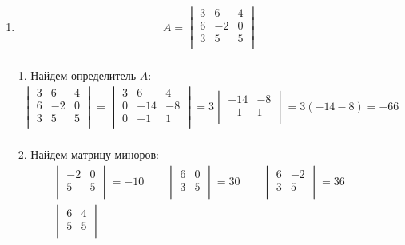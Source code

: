 \begin{enumerate}
		\item
			\begin{gather*}
				A = 
				\begin{vmatrix}
					3 & 6 & 4\\
					6 & -2 & 0\\
					3 & 5 & 5\\
				\end{vmatrix}
			\end{gather*} 
			\\
			1. Найдем определитель $A$:
			\begin{gather*}
				\begin{vmatrix}
					3 & 6 & 4\\
					6 & -2 & 0\\
					3 & 5 & 5\\
				\end{vmatrix}
				=
				\begin{vmatrix}
					3 & 6 & 4\\
					0 & -14 & -8\\
					0 & -1 & 1\\
				\end{vmatrix}
				= 3
				\begin{vmatrix}
					-14 & -8\\
					-1 & 1\\
				\end{vmatrix}
				= 3(-14 - 8) = -66
			\end{gather*} 
			\\
			2. Найдем матрицу миноров: 
			\begin{gather*}
				\begin{vmatrix}
					-2 & 0\\
					5 & 5\\
				\end{vmatrix}
				= -10\qquad
				\begin{vmatrix}
					6 & 0\\
					3 & 5\\
				\end{vmatrix}
				= 30\qquad
				\begin{vmatrix}
					6 & -2\\
					3 & 5\\
				\end{vmatrix}
				= 36\qquad
				\\
				\begin{vmatrix}
					6 & 4\\
					5 & 5\\
				\end{vmatrix}

\end{gather*}
\end{enumerate}
